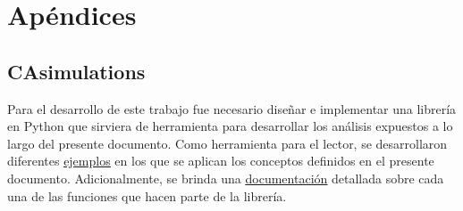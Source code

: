 \chapter{Apéndices}

\section{CAsimulations}\label{CAsimulations}

Para el desarrollo de este trabajo fue necesario diseñar e implementar una librería en Python que sirviera de herramienta para desarrollar los análisis expuestos a lo largo del presente documento. Como herramienta para el lector, se desarrollaron diferentes \href{https://github.com/Grupo-de-simulacion-con-automatas/Prediccion-del-comportamiento-de-una-enfermedad-simulada-en-AC-con-un-algoritmo-en-RN/tree/master/Codigo}{\underline{ejemplos}} en los que se aplican los conceptos definidos en el presente documento. Adicionalmente, se brinda una \href{https://grupo-de-simulacion-con-automatas.github.io/CAsimulations-Modelacion-de-dinamicas-topologicas-en-la-propagacion-de-una-enfermedad-usando-CA/}{\underline{documentación}} detallada sobre cada una de las funciones que hacen parte de la librería.


